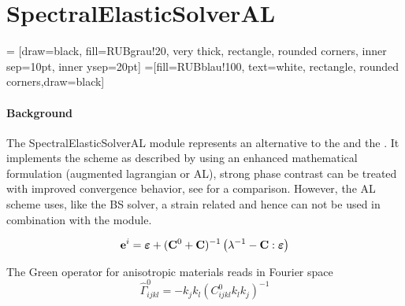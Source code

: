 \section{SpectralElasticSolverAL}
\label{sec:module_spectralelasticsolverAL}

 = [draw=black, fill=RUBgrau!20, very thick, rectangle, rounded corners, inner sep=10pt, inner ysep=20pt]
 =[fill=RUBblau!100, text=white, rectangle, rounded corners,draw=black]

\paragraph{Background} The SpectralElasticSolverAL module represents an alternative to the  and the . It implements the scheme as described by  using an enhanced mathematical formulation (augmented lagrangian or AL), strong phase contrast can be treated with improved convergence behavior, see  for a comparison. However, the AL scheme uses, like the BS solver, a strain related and hence can not be used in combination with the  module.

\begin{equation}
  \mathbf{e}^i = \mbox{\boldmath $\varepsilon$} + (\mathbf{C}^0 + \mathbf{C})^{-1}\left(\lambda^{-1}-\mathbf{C}:\mbox{\boldmath $\varepsilon$}\right)
\end{equation}

The Green operator for anisotropic materials reads in Fourier space
\begin{equation}
  \hat{\Gamma}^0_{ijkl} = -k_j k_l \left(C^0_{ijkl} k_l k_j \right)^{-1} 
\end{equation}

